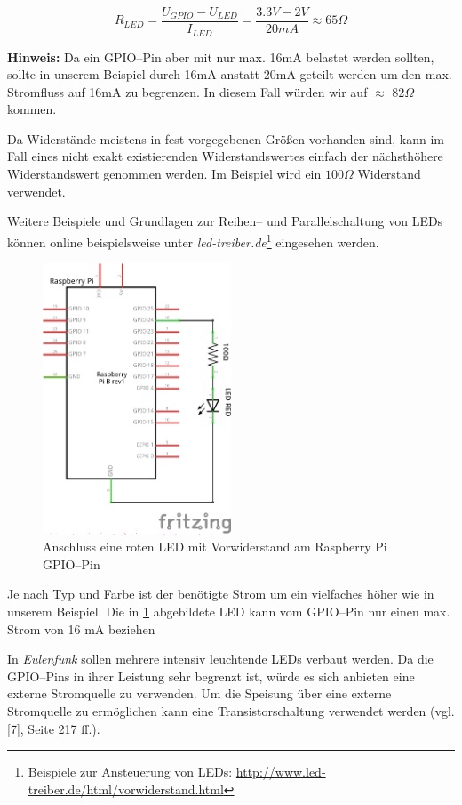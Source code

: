 \documentclass[11pt,ngerman,toc=listof,index=totoc]{scrreprt}
\begin{document}
\[R_{LED} = \frac{U_{GPIO}-U_{LED}}{I_{LED}} = \frac{3.3V - 2V}{20mA}   \approx 65\Omega\]

\textbf{Hinweis:} Da ein GPIO--Pin aber mit nur max. 16mA belastet
werden sollten, sollte in unserem Beispiel durch 16mA anstatt 20mA
geteilt werden um den max. Stromfluss auf 16mA zu begrenzen. In diesem
Fall würden wir auf \(\approx\) 82\(\Omega\) kommen.

Da Widerstände meistens in fest vorgegebenen Größen vorhanden sind, kann
im Fall eines nicht exakt existierenden Widerstandswertes einfach der
nächsthöhere Widerstandswert genommen werden. Im Beispiel wird ein
\(100\Omega\) Widerstand verwendet.

Weitere Beispiele und Grundlagen zur Reihen-- und Parallelschaltung von
LEDs können online beispielsweise unter \emph{led-treiber.de}\footnote{Beispiele
  zur Ansteuerung von LEDs:
  \url{http://www.led-treiber.de/html/vorwiderstand.html}} eingesehen
werden.

\begin{figure}[h!]
  \centering
\includegraphics[width=0.5\textwidth]{images/led.png}
  \caption{Anschluss eine roten LED mit Vorwiderstand am Raspberry Pi GPIO--Pin}
  \label{led}
\end{figure}

Je nach Typ und Farbe ist der benötigte Strom um ein vielfaches höher
wie in unserem Beispiel. Die in \ref{led} abgebildete LED kann vom
GPIO--Pin nur einen max. Strom von 16 mA beziehen

In \emph{Eulenfunk} sollen mehrere intensiv leuchtende LEDs verbaut
werden. Da die GPIO--Pins in ihrer Leistung sehr begrenzt ist, würde es
sich anbieten eine externe Stromquelle zu verwenden. Um die Speisung
über eine externe Stromquelle zu ermöglichen kann eine
Transistorschaltung verwendet werden (vgl. {[}7{]}, Seite 217 ff.).
\end{document}
